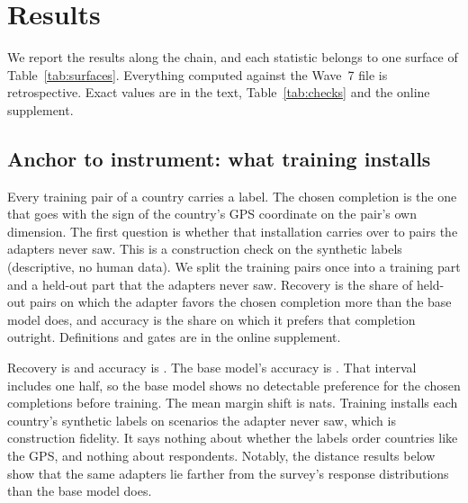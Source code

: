 \section{Results}\label{sec:results}

We report the results along the chain, and each statistic belongs to one surface of Table~\ref{tab:surfaces}. Everything computed against the Wave~7 file is retrospective. Exact values are in the text, Table~\ref{tab:checks} and the online supplement.

\subsection{Anchor to instrument: what training installs}\label{sec:res-recovery}

Every training pair of a country carries a label. The chosen completion is the one that goes with the sign of the country's GPS coordinate on the pair's own dimension. The first question is whether that installation carries over to pairs the adapters never saw. This is a construction check on the synthetic labels (descriptive, no human data). We split the training pairs once into a training part and a held-out part that the adapters never saw. Recovery is the share of held-out pairs on which the adapter favors the chosen completion more than the base model does, and accuracy is the share on which it prefers that completion outright. Definitions and gates are in the online supplement.

Recovery is   and accuracy is  . The base model's accuracy is  . That interval includes one half, so the base model shows no detectable preference for the chosen completions before training. The mean margin shift is   nats. Training installs each country's synthetic labels on scenarios the adapter never saw, which is construction fidelity. It says nothing about whether the labels order countries like the GPS, and nothing about respondents. Notably, the distance results below show that the same adapters lie farther from the survey's response distributions than the base model does.

